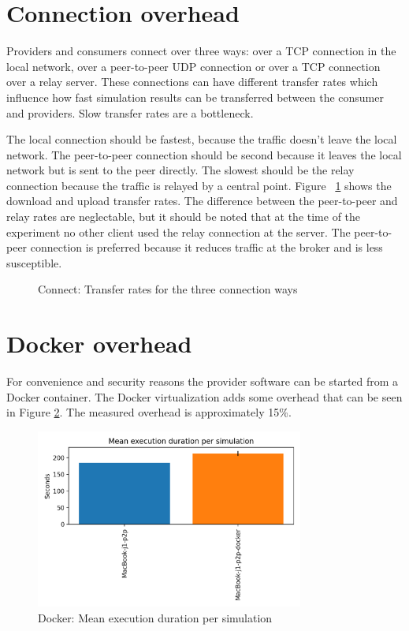 \section{Connection overhead}

Providers and consumers connect over three ways: over a TCP connection in the local network, over a peer-to-peer UDP connection or over a TCP connection over a relay server. These connections can have different transfer rates which influence how fast simulation results can be transferred between the consumer and providers. Slow transfer rates are a bottleneck.

The local connection should be fastest, because the traffic doesn't leave the local network. The peer-to-peer connection should be second because it leaves the local network but is sent to the peer directly. The slowest should be the relay connection because the traffic is relayed by a central point. Figure ~\ref{fig:eval-connect-transfer} shows the download and upload transfer rates. The difference between the peer-to-peer and relay rates are neglectable, but it should be noted that at the time of the experiment no other client used the relay connection at the server. The peer-to-peer connection is preferred because it reduces traffic at the broker and is less susceptible.

\begin{figure}[h]
  \centering
  
  \caption{Connect: Transfer rates for the three connection ways}
  \label{fig:eval-connect-transfer}
\end{figure}

\section{Docker overhead}

For convenience and security reasons the provider software can be started from a Docker container. The Docker virtualization adds some overhead that can be seen in Figure \ref{fig:eval-docker-sim-run}. The measured overhead is approximately 15\%.

\begin{figure}[h]
  \centering
  \includegraphics[width=250pt]{images/eval/docker/Mean execution duration per simulation}
  \caption{Docker: Mean execution duration per simulation}
  \label{fig:eval-docker-sim-run}
\end{figure}





